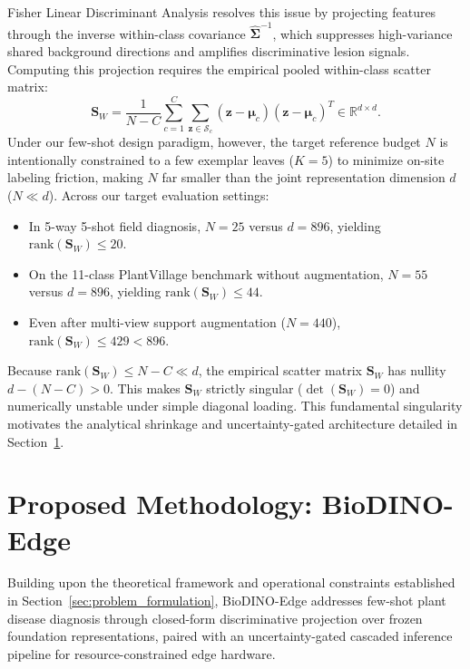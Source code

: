 \documentclass[preprint,12pt]{elsarticle}
\begin{document}
Fisher Linear Discriminant Analysis resolves this issue by projecting features through the inverse within-class covariance $\hat{\mathbf{\Sigma}}^{-1}$, which suppresses high-variance shared background directions and amplifies discriminative lesion signals. Computing this projection requires the empirical pooled within-class scatter matrix:
\begin{equation}
    \mathbf{S}_W = \frac{1}{N - C} \sum_{c=1}^C \sum_{\mathbf{z} \in \mathcal{S}_c} (\mathbf{z} - \boldsymbol{\mu}_c)(\mathbf{z} - \boldsymbol{\mu}_c)^T \in \mathbb{R}^{d \times d}.
    \label{eq:empirical_scatter}
\end{equation}
Under our few-shot design paradigm, however, the target reference budget $N$ is intentionally constrained to a few exemplar leaves ($K=5$) to minimize on-site labeling friction, making $N$ far smaller than the joint representation dimension $d$ ($N \ll d$). Across our target evaluation settings:
\begin{itemize}
    \item In 5-way 5-shot field diagnosis, $N = 25$ versus $d = 896$, yielding $\text{rank}(\mathbf{S}_W) \le 20$.
    \item On the 11-class PlantVillage benchmark without augmentation, $N = 55$ versus $d = 896$, yielding $\text{rank}(\mathbf{S}_W) \le 44$.
    \item Even after multi-view support augmentation ($N = 440$), $\text{rank}(\mathbf{S}_W) \le 429 < 896$.
\end{itemize}
Because $\text{rank}(\mathbf{S}_W) \le N - C \ll d$, the empirical scatter matrix $\mathbf{S}_W$ has nullity $d - (N - C) > 0$. This makes $\mathbf{S}_W$ strictly singular ($\det(\mathbf{S}_W) = 0$) and numerically unstable under simple diagonal loading. This fundamental singularity motivates the analytical shrinkage and uncertainty-gated architecture detailed in Section~\ref{sec:methodology}.
\section{Proposed Methodology: BioDINO-Edge}
\label{sec:methodology}
Building upon the theoretical framework and operational constraints established in Section~\ref{sec:problem_formulation}, BioDINO-Edge addresses few-shot plant disease diagnosis through closed-form discriminative projection over frozen foundation representations, paired with an uncertainty-gated cascaded inference pipeline for resource-constrained edge hardware.
\end{document}
